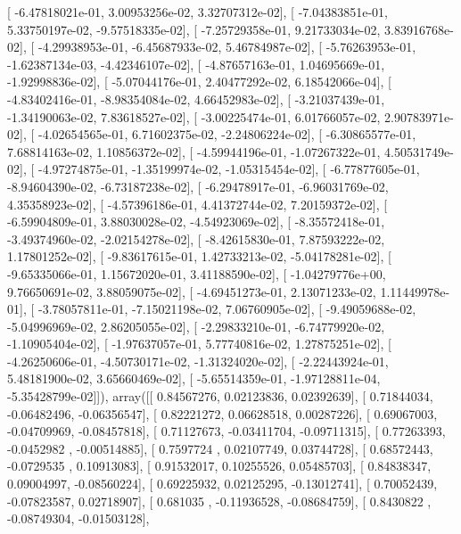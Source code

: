 \documentclass{article}
\begin{document}
       [ -6.47818021e-01,   3.00953256e-02,   3.32707312e-02],
       [ -7.04383851e-01,   5.33750197e-02,  -9.57518335e-02],
       [ -7.25729358e-01,   9.21733034e-02,   3.83916768e-02],
       [ -4.29938953e-01,  -6.45687933e-02,   5.46784987e-02],
       [ -5.76263953e-01,  -1.62387134e-03,  -4.42346107e-02],
       [ -4.87657163e-01,   1.04695669e-01,  -1.92998836e-02],
       [ -5.07044176e-01,   2.40477292e-02,   6.18542066e-04],
       [ -4.83402416e-01,  -8.98354084e-02,   4.66452983e-02],
       [ -3.21037439e-01,  -1.34190063e-02,   7.83618527e-02],
       [ -3.00225474e-01,   6.01766057e-02,   2.90783971e-02],
       [ -4.02654565e-01,   6.71602375e-02,  -2.24806224e-02],
       [ -6.30865577e-01,   7.68814163e-02,   1.10856372e-02],
       [ -4.59944196e-01,  -1.07267322e-01,   4.50531749e-02],
       [ -4.97274875e-01,  -1.35199974e-02,  -1.05315454e-02],
       [ -6.77877605e-01,  -8.94604390e-02,  -6.73187238e-02],
       [ -6.29478917e-01,  -6.96031769e-02,   4.35358923e-02],
       [ -4.57396186e-01,   4.41372744e-02,   7.20159372e-02],
       [ -6.59904809e-01,   3.88030028e-02,  -4.54923069e-02],
       [ -8.35572418e-01,  -3.49374960e-02,  -2.02154278e-02],
       [ -8.42615830e-01,   7.87593222e-02,   1.17801252e-02],
       [ -9.83617615e-01,   1.42733213e-02,  -5.04178281e-02],
       [ -9.65335066e-01,   1.15672020e-01,   3.41188590e-02],
       [ -1.04279776e+00,   9.76650691e-02,   3.88059075e-02],
       [ -4.69451273e-01,   2.13071233e-02,   1.11449978e-01],
       [ -3.78057811e-01,  -7.15021198e-02,   7.06760905e-02],
       [ -9.49059688e-02,  -5.04996969e-02,   2.86205055e-02],
       [ -2.29833210e-01,  -6.74779920e-02,  -1.10905404e-02],
       [ -1.97637057e-01,   5.77740816e-02,   1.27875251e-02],
       [ -4.26250606e-01,  -4.50730171e-02,  -1.31324020e-02],
       [ -2.22443924e-01,   5.48181900e-02,   3.65660469e-02],
       [ -5.65514359e-01,  -1.97128811e-04,  -5.35428799e-02]]), array([[ 0.84567276,  0.02123836,  0.02392639],
       [ 0.71844034, -0.06482496, -0.06356547],
       [ 0.82221272,  0.06628518,  0.00287226],
       [ 0.69067003, -0.04709969, -0.08457818],
       [ 0.71127673, -0.03411704, -0.09711315],
       [ 0.77263393, -0.0452982 , -0.00514885],
       [ 0.7597724 ,  0.02107749,  0.03744728],
       [ 0.68572443, -0.0729535 ,  0.10913083],
       [ 0.91532017,  0.10255526,  0.05485703],
       [ 0.84838347,  0.09004997, -0.08560224],
       [ 0.69225932,  0.02125295, -0.13012741],
       [ 0.70052439, -0.07823587,  0.02718907],
       [ 0.681035  , -0.11936528, -0.08684759],
       [ 0.8430822 , -0.08749304, -0.01503128],
\end{document}

